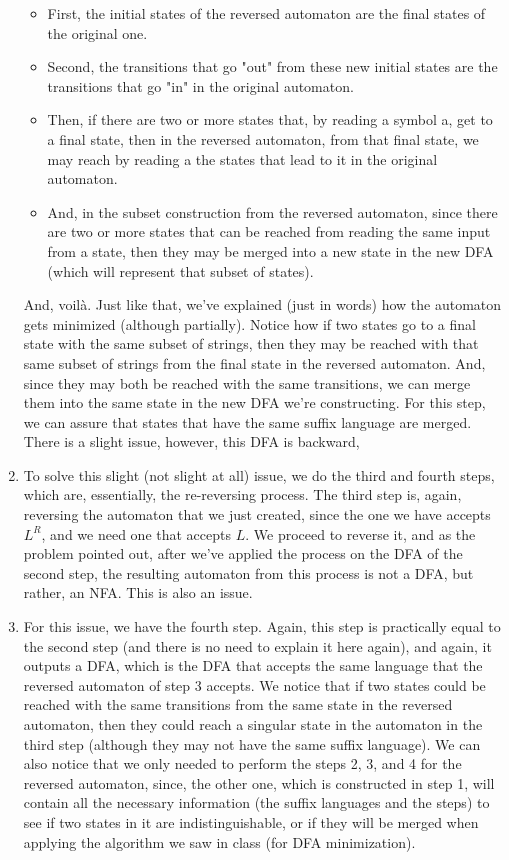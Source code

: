 \documentclass[12pt]{article}
\begin{document}
\begin{enumerate}
    \begin{itemize}
        \item First, the initial states of the reversed automaton are the final states of the original one.
        \item Second, the transitions that go "out" from these new initial states are the transitions that go "in" in the original automaton.
        \item Then, if there are two or more states that, by reading a symbol a, get to a final state, then in the reversed automaton, from that final state, we may reach by reading a the states that lead to it in the original automaton.
        \item And, in the subset construction from the reversed automaton, since there are two or more states that can be reached from reading the same input from a state, then they may be merged into a new state in the new DFA (which will represent that subset of states).
    \end{itemize}
    
    And, voilà. Just like that, we've explained (just in words) how the automaton gets minimized (although partially). Notice how if two states go to a final state with the same subset of strings, then they may be reached with that same subset of strings from the final state in the reversed automaton. And, since they may both be reached with the same transitions, we can merge them into the same state in the new DFA we're constructing. For this step, we can assure that states that have the same suffix language are merged. There is a slight issue, however, this DFA is backward,
    
    \item To solve this slight (not slight at all) issue, we do the third and fourth steps, which are, essentially, the re-reversing process. The third step is, again, reversing the automaton that we just created, since the one we have accepts $L^R$, and we need one that accepts $L$. We proceed to reverse it, and as the problem pointed out, after we've applied the process on the DFA of the second step, the resulting automaton from this process is not a DFA, but rather, an NFA. This is also an issue.
    
    \item For this issue, we have the fourth step. Again, this step is practically equal to the second step (and there is no need to explain it here again), and again, it outputs a DFA, which is the DFA that accepts the same language that the reversed automaton of step 3 accepts. We notice that if two states could be reached with the same transitions from the same state in the reversed automaton, then they could reach a singular state in the automaton in the third step (although they may not have the same suffix language). We can also notice that we only needed to perform the steps 2, 3, and 4 for the reversed automaton, since, the other one, which is constructed in step 1, will contain all the necessary information (the suffix languages and the steps) to see if two states in it are indistinguishable, or if they will be merged when applying the algorithm we saw in class (for DFA minimization).
\end{enumerate}
\end{document}
